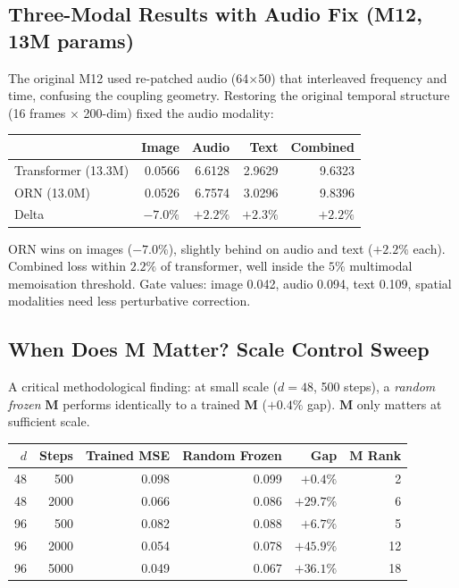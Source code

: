 \documentclass[11pt, a4paper]{article}
\newcommand{\M}{\mathbf{M}}
\theoremstyle{remark}
\begin{document}
\subsection{Three-Modal Results with Audio Fix (M12, 13M params)}

The original M12 used re-patched audio (64$\times$50) that interleaved frequency and time, confusing the coupling geometry.
Restoring the original temporal structure (16 frames $\times$ 200-dim) fixed the audio modality:

\begin{center}\small
\begin{tabular}{@{}lrrrr@{}}
\toprule
& \textbf{Image} & \textbf{Audio} & \textbf{Text} & \textbf{Combined} \\
\midrule
Transformer (13.3M) & 0.0566 & 6.6128 & 2.9629 & 9.6323 \\
ORN (13.0M) & 0.0526 & 6.7574 & 3.0296 & 9.8396 \\
Delta & $-7.0\%$ & $+2.2\%$ & $+2.3\%$ & $+2.2\%$ \\
\bottomrule
\end{tabular}
\end{center}

ORN wins on images ($-7.0\%$), slightly behind on audio and text ($+2.2\%$ each).
Combined loss within $2.2\%$ of transformer, well inside the $5\%$ multimodal memoisation threshold.
Gate values: image 0.042, audio 0.094, text 0.109, spatial modalities need less perturbative correction.

\subsection{When Does M Matter? Scale Control Sweep}

A critical methodological finding: at small scale ($d{=}48$, 500 steps), a \emph{random frozen} $\M$ performs identically to a trained $\M$ ($+0.4\%$ gap).
$\M$ only matters at sufficient scale.

\begin{center}\small
\begin{tabular}{@{}rrrrrr@{}}
\toprule
\textbf{$d$} & \textbf{Steps} & \textbf{Trained MSE} & \textbf{Random Frozen} & \textbf{Gap} & \textbf{$\M$ Rank} \\
\midrule
48 & 500 & 0.098 & 0.099 & $+0.4\%$ & 2 \\
48 & 2000 & 0.066 & 0.086 & $+29.7\%$ & 6 \\
96 & 500 & 0.082 & 0.088 & $+6.7\%$ & 5 \\
96 & 2000 & 0.054 & 0.078 & $+45.9\%$ & 12 \\
96 & 5000 & 0.049 & 0.067 & $+36.1\%$ & 18 \\
\bottomrule
\end{tabular}
\end{center}
\end{document}

